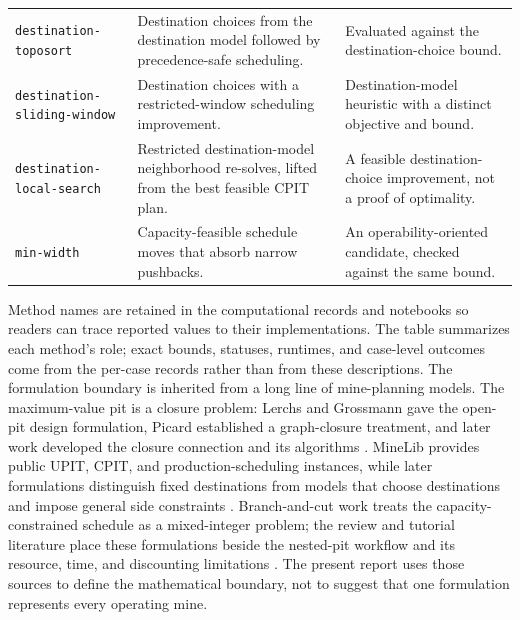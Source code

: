 \documentclass[11pt]{article}
\begin{document}
{\begin{longtable}{>{\raggedright\arraybackslash}p{}>{\raggedright\arraybackslash}p{}>{\raggedright\arraybackslash}p{}}
\texttt{destination-toposort} & Destination choices from the destination model followed by precedence-safe scheduling. & Evaluated against the destination-choice bound.\\
\texttt{destination-\allowbreak sliding-\allowbreak window} & Destination choices with a restricted-window scheduling improvement. & Destination-model heuristic with a distinct objective and bound.\\
\texttt{destination-\allowbreak local-\allowbreak search} & Restricted destination-model neighborhood re-solves, lifted from the best feasible CPIT plan. & A feasible destination-choice improvement, not a proof of optimality.\\
\texttt{min-width} & Capacity-feasible schedule moves that absorb narrow pushbacks. & An operability-oriented candidate, checked against the same bound.\\
\bottomrule
\end{longtable}
}
Method names are retained in the computational records and notebooks so readers can trace reported values to their implementations. The table summarizes each method’s role; exact bounds, statuses, runtimes, and case-level outcomes come from the per-case records rather than from these descriptions.
The formulation boundary is inherited from a long line of mine-planning models. The maximum-value pit is a closure problem: Lerchs and Grossmann gave the open-pit design formulation, Picard established a graph-closure treatment, and later work developed the closure connection and its algorithms \cite{lerchs1965,picard1976,hochbaum2004}. MineLib provides public UPIT, CPIT, and production-scheduling instances, while later formulations distinguish fixed destinations from models that choose destinations and impose general side constraints \cite{espinoza2013,jelvez2018,chicoisne}. Branch-and-cut work treats the capacity-constrained schedule as a mixed-integer problem; the review and tutorial literature place these formulations beside the nested-pit workflow and its resource, time, and discounting limitations \cite{caccetta2003,newman2010,lambert2014,meagher2014}. The present report uses those sources to define the mathematical boundary, not to suggest that one formulation represents every operating mine.
\end{document}
